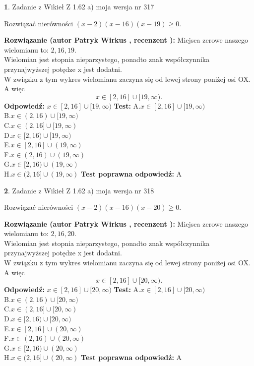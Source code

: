 \documentclass[12pt, a4paper]{article}
\theoremstyle{definition} %
\newtheorem{zad}{}
\newcommand{\zadStart}[1]{\begin{zad}#1\newline}
\newcommand{\zadStop}{\end{zad}}
\newcommand{\rozwStart}[2]{\noindent \textbf{Rozwiązanie (autor #1 , recenzent #2): }\newline}
\newcommand{\rozwStop}{\newline}
\newcommand{\odpStart}{\noindent \textbf{Odpowiedź:}\newline}
\newcommand{\odpStop}{\newline}
\newcommand{\testStart}{\noindent \textbf{Test:}\newline}
\newcommand{\testStop}{\newline}
\newcommand{\kluczStart}{\noindent \textbf{Test poprawna odpowiedź:}\newline}
\newcommand{\kluczStop}{\newline}
\begin{document}
\zadStart{Zadanie z Wikieł Z 1.62 a) moja wersja nr 317}

Rozwiązać nierówności $(x-2)(x-16)(x-19)\ge0$.
\zadStop
\rozwStart{Patryk Wirkus}{}
Miejsca zerowe naszego wielomianu to: $2, 16, 19$.\\
Wielomian jest stopnia nieparzystego, ponadto znak współczynnika przy\linebreak najwyższej potędze x jest dodatni.\\ W związku z tym wykres wielomianu zaczyna się od lewej strony poniżej osi OX. A więc $$x \in [2,16] \cup [19,\infty).$$
\rozwStop
\odpStart
$x \in [2,16] \cup [19,\infty)$
\odpStop
\testStart
A.$x \in [2,16] \cup [19,\infty)$\\
B.$x \in (2,16) \cup [19,\infty)$\\
C.$x \in (2,16] \cup [19,\infty)$\\
D.$x \in [2,16) \cup [19,\infty)$\\
E.$x \in [2,16] \cup (19,\infty)$\\
F.$x \in (2,16) \cup (19,\infty)$\\
G.$x \in [2,16) \cup (19,\infty)$\\
H.$x \in (2,16] \cup (19,\infty)$
\testStop
\kluczStart
A
\kluczStop



\zadStart{Zadanie z Wikieł Z 1.62 a) moja wersja nr 318}

Rozwiązać nierówności $(x-2)(x-16)(x-20)\ge0$.
\zadStop
\rozwStart{Patryk Wirkus}{}
Miejsca zerowe naszego wielomianu to: $2, 16, 20$.\\
Wielomian jest stopnia nieparzystego, ponadto znak współczynnika przy\linebreak najwyższej potędze x jest dodatni.\\ W związku z tym wykres wielomianu zaczyna się od lewej strony poniżej osi OX. A więc $$x \in [2,16] \cup [20,\infty).$$
\rozwStop
\odpStart
$x \in [2,16] \cup [20,\infty)$
\odpStop
\testStart
A.$x \in [2,16] \cup [20,\infty)$\\
B.$x \in (2,16) \cup [20,\infty)$\\
C.$x \in (2,16] \cup [20,\infty)$\\
D.$x \in [2,16) \cup [20,\infty)$\\
E.$x \in [2,16] \cup (20,\infty)$\\
F.$x \in (2,16) \cup (20,\infty)$\\
G.$x \in [2,16) \cup (20,\infty)$\\
H.$x \in (2,16] \cup (20,\infty)$
\testStop
\kluczStart
A
\kluczStop
\end{document}
